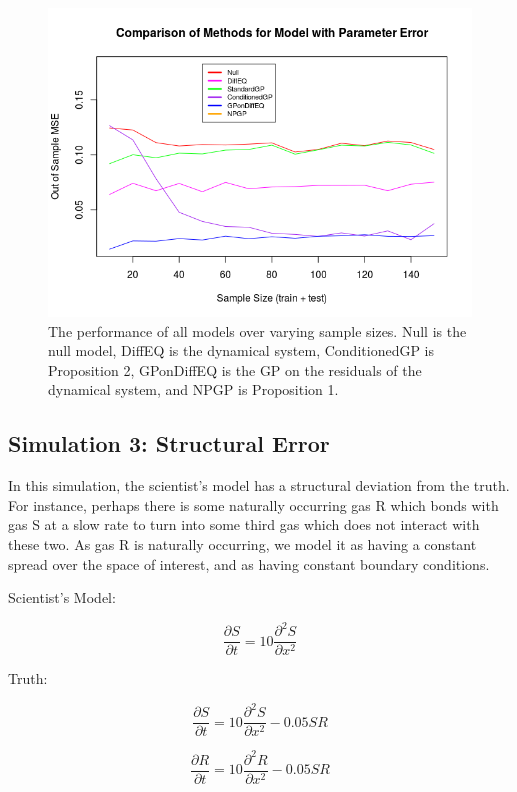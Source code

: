 \documentclass{article}
\begin{document}
	\begin{figure}[H]
		\includegraphics[scale=0.7]{PrezImage3.png}
		\caption{The performance of all models over varying sample sizes. Null is the null model, DiffEQ is the dynamical system, ConditionedGP is Proposition 2, GPonDiffEQ is the GP on the residuals of the dynamical system, and NPGP is Proposition 1.}
		\label{fig8}
	\end{figure}
	
	\subsection{Simulation 3: Structural Error}
	
	In this simulation, the scientist's model has a structural deviation from the truth. For instance, perhaps there is some naturally occurring gas R which bonds with gas S at a slow rate to turn into some third gas which does not interact with these two. As gas R is naturally occurring, we model it as having a constant spread over the space of interest, and as having constant boundary conditions.
	
	Scientist's Model:
	
	$$\frac{\partial S}{\partial t} = 10 \frac{\partial^2 S}{\partial x^2}$$
	
	\vspace{1em}
	
	Truth:
	
	$$\frac{\partial S}{\partial t} = 10 \frac{\partial^2 S}{\partial x^2} - 0.05 S R$$
	
	$$\frac{\partial R}{\partial t} = 10 \frac{\partial^2 R}{\partial x^2} - 0.05 S R$$
	
\end{document}
